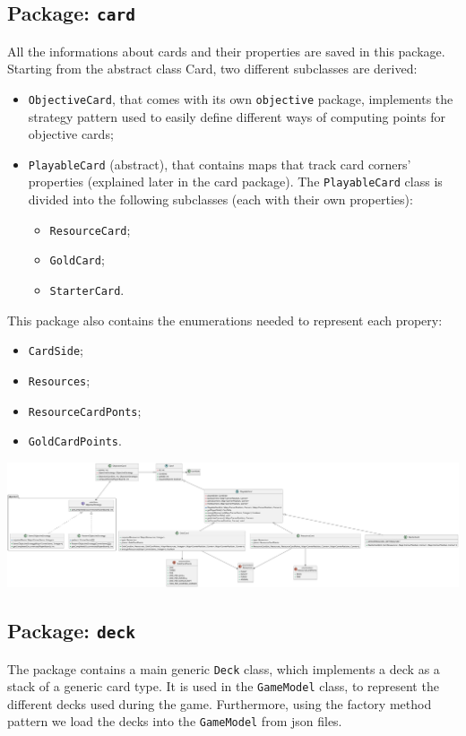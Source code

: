 \documentclass{article}
\begin{document}
\subsection{Package: \texttt{card}}
All the informations about cards and their properties are saved in this package.
Starting from the abstract class Card, two different subclasses are derived:
\begin{itemize}
    \item \texttt{ObjectiveCard}, that comes with its own \texttt{objective} package, implements the strategy pattern used to easily define different ways of computing points for objective cards;
    \item \texttt{PlayableCard} (abstract), that contains maps that track card corners' properties (explained later in the card package). 
    The \texttt{PlayableCard} class is divided into the following subclasses (each with their own properties):
    \begin{itemize}
        \item \texttt{ResourceCard};
        \item \texttt{GoldCard};
        \item \texttt{StarterCard}.
    \end{itemize}
\end{itemize}
This package also contains the enumerations needed to represent each propery:
\begin{itemize}
    \item \texttt{CardSide};
    \item \texttt{Resources};
    \item \texttt{ResourceCardPonts};
    \item \texttt{GoldCardPoints}.
\end{itemize}
\vspace{1cm}
\begin{center}
    \hspace*{-3cm}\includegraphics[scale=0.18]{pngs/card}
\end{center}
\newpage
\noindent

\subsection{Package: \texttt{deck}}
The package contains a main generic \texttt{Deck} class, which implements a deck as a stack of a generic card type.
It is used in the \texttt{GameModel} class, to represent the different decks used during the game. 
Furthermore, using the factory method pattern we load the decks into the \texttt{GameModel} from json files.
\end{document}
